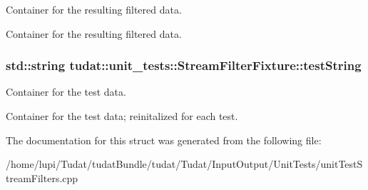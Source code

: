 Container for the resulting filtered data. 

Container for the resulting filtered data. 
\subsubsection[{\texorpdfstring{test\+String}{testString}}]{\setlength{\rightskip}{0pt plus 5cm}std\+::string tudat\+::unit\+\_\+tests\+::\+Stream\+Filter\+Fixture\+::test\+String}\hypertarget{structtudat_1_1unit__tests_1_1StreamFilterFixture_aa817cd363468b94a093064bc234b578b}{}\label{structtudat_1_1unit__tests_1_1StreamFilterFixture_aa817cd363468b94a093064bc234b578b}


Container for the test data. 

Container for the test data; reinitalized for each test. 

The documentation for this struct was generated from the following file\+:\begin{DoxyCompactItemize}
\item 
/home/lupi/\+Tudat/tudat\+Bundle/tudat/\+Tudat/\+Input\+Output/\+Unit\+Tests/unit\+Test\+Stream\+Filters.\+cpp\end{DoxyCompactItemize}
